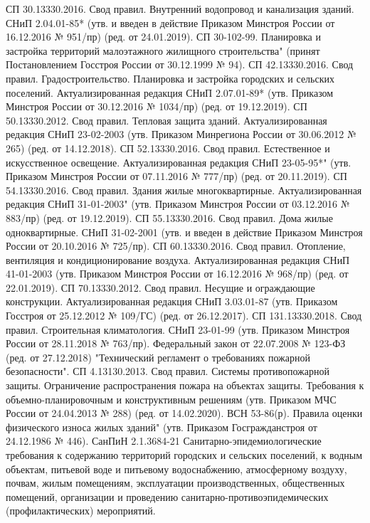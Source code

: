 \begin{thebibliography}{9}
СП 30.13330.2016. Свод правил. Внутренний водопровод и канализация зданий. СНиП 2.04.01-85* (утв. и введен в действие Приказом Минстроя России от 16.12.2016 № 951/пр) (ред. от 24.01.2019).  
СП 30-102-99. Планировка и застройка территорий малоэтажного жилищного строительства" (принят Постановлением Госстроя России от 30.12.1999 № 94).  
СП 42.13330.2016. Свод правил. Градостроительство. Планировка и застройка городских и сельских поселений. Актуализированная редакция СНиП 2.07.01-89* (утв. Приказом Минстроя России от 30.12.2016 № 1034/пр) (ред. от 19.12.2019).  
СП 50.13330.2012. Свод правил. Тепловая защита зданий. Актуализированная редакция СНиП 23-02-2003 (утв. Приказом Минрегиона России от 30.06.2012 № 265) (ред. от 14.12.2018).  
СП 52.13330.2016. Свод правил. Естественное и искусственное освещение. Актуализированная редакция СНиП 23-05-95*" (утв. Приказом Минстроя России от 07.11.2016 № 777/пр) (ред. от 20.11.2019).  
СП 54.13330.2016. Свод правил. Здания жилые многоквартирные. Актуализированная редакция СНиП 31-01-2003" (утв. Приказом Минстроя России от 03.12.2016 № 883/пр) (ред. от 19.12.2019).  
СП 55.13330.2016. Свод правил. Дома жилые одноквартирные. СНиП 31-02-2001 (утв. и введен в действие Приказом Минстроя России от 20.10.2016 № 725/пр).  
СП 60.13330.2016. Свод правил. Отопление, вентиляция и кондиционирование воздуха. Актуализированная редакция СНиП 41-01-2003 (утв. Приказом Минстроя России от 16.12.2016 № 968/пр) (ред. от 22.01.2019).  
СП 70.13330.2012. Свод правил. Несущие и ограждающие конструкции. Актуализированная редакция СНиП 3.03.01-87 (утв. Приказом Госстроя от 25.12.2012 № 109/ГС) (ред. от 26.12.2017).  
СП 131.13330.2018. Свод правил. Строительная климатология. СНиП 23-01-99 (утв. Приказом Минстроя России от 28.11.2018 № 763/пр).  
Федеральный закон от 22.07.2008 № 123-ФЗ (ред. от 27.12.2018) "Технический регламент о требованиях пожарной безопасности".  
СП 4.13130.2013. Свод правил. Системы противопожарной защиты. Ограничение распространения пожара на объектах защиты. Требования к объемно-планировочным и конструктивным решениям (утв. Приказом МЧС России от 24.04.2013 № 288) (ред. от 14.02.2020).  
ВСН 53-86(р). Правила оценки физического износа жилых зданий" (утв. Приказом Госгражданстроя от 24.12.1986 № 446).  
СанПиН 2.1.3684-21 Санитарно-эпидемиологические требования к содержанию территорий городских и сельских поселений, к водным объектам, питьевой воде и питьевому водоснабжению, атмосферному воздуху, почвам, жилым помещениям, эксплуатации производственных, общественных помещений, организации и проведению санитарно-противоэпидемических (профилактических) мероприятий.  

\end{thebibliography}
